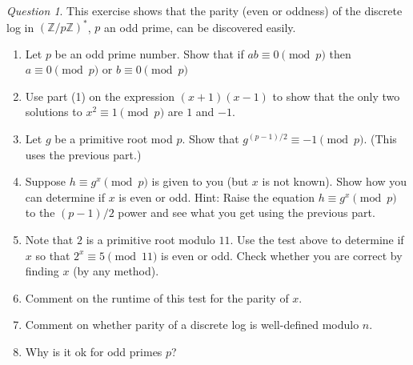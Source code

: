 \documentclass{article}
\theoremstyle{plain}
\theoremstyle{definition}
\theoremstyle{remark}
\newtheorem{question}[theorem]{Question}
\numberwithin{theorem}{section}
\newcommand{\ZZ}{\mathbb{Z}}
\begin{document}
\begin{question}
This exercise shows that the parity (even or oddness) of the discrete log in $(\ZZ/p\ZZ)^*$, $p$ an odd prime, can be discovered easily.
\begin{enumerate}
    \item Let $p$ be an odd prime number.
Show that if $ab \equiv 0 \pmod p$ then $a \equiv 0 \pmod p$ or $b \equiv 0 \pmod p$
\item Use part (1) on the expression $(x+1)(x-1)$ to show that the only two solutions to $x^2 \equiv 1 \pmod p$ are $1$ and $-1$.
\item Let $g$ be a primitive root mod $p$. Show that $g^{(p-1)/2} \equiv -1 \pmod p$.  (This uses the previous part.)
\item 
Suppose $h \equiv g^x \pmod p$ is given to you (but $x$ is not known).
Show how you can determine if $x$ is even or odd.
 Hint: Raise the equation $h\equiv g^x \pmod p$ to the $(p-1)/2$ power and see what you get using the previous part.

\item Note that $2$ is a primitive root modulo $11$. Use the test above to determine if $x$ so that $2^x \equiv 5 \pmod{11}$ is even or odd.
Check whether you are correct by finding $x$ (by any method).
\item Comment on the runtime of this test for the parity of $x$.
\item Comment on whether parity of a discrete log is well-defined modulo $n$.
\item Why is it ok for odd primes $p$?
\end{enumerate}
\end{question}
\end{document}
